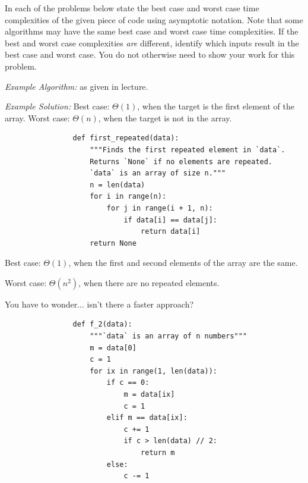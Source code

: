 \begin{prob}
    In each of the problems below state the best case and worst case time
    complexities of the given piece of code using asymptotic notation. Note that
    some algorithms may have the same best case and worst case time complexities. If
    the best and worst case complexities \emph{are} different, identify which
    inputs result in the best case and worst case. You do not otherwise need to show your work for
    this problem.

    \emph{Example Algorithm:}  as given in lecture. 

    \emph{Example Solution:}
    Best case: $\Theta(1)$, when the target is the first element of the array.
    Worst case: $\Theta(n)$, when the target is not in the array.

    \begin{subprobset}
        \begin{subprob}
            \begin{verbatim}
                def first_repeated(data):
                    """Finds the first repeated element in `data`.
                    Returns `None` if no elements are repeated.
                    `data` is an array of size n."""
                    n = len(data)
                    for i in range(n):
                        for j in range(i + 1, n):
                            if data[i] == data[j]:
                                return data[i]
                    return None
            \end{verbatim}

            \begin{soln}
                Best case: $\Theta(1)$, when the first and second elements of the array
                are the same.

                Worst case: $\Theta(n^2)$, when there are no repeated elements.

                You have to wonder... isn't there a faster approach?
            \end{soln}
        \end{subprob}

        \begin{subprob}
            \begin{verbatim}
                def f_2(data):
                    """`data` is an array of n numbers"""
                    m = data[0]
                    c = 1
                    for ix in range(1, len(data)):
                        if c == 0:
                            m = data[ix]
                            c = 1
                        elif m == data[ix]:
                            c += 1
                            if c > len(data) // 2:
                                return m
                        else:
                            c -= 1


\end{verbatim}
\end{subprob}
\end{subprobset}
\end{prob}
